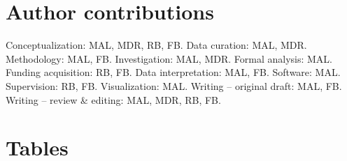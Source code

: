 \documentclass{article}
\begin{document}
\section*{Author contributions}
Conceptualization: MAL, MDR, RB, FB.
Data curation: MAL, MDR.
Methodology: MAL, FB.
Investigation: MAL, MDR.
Formal analysis: MAL.
Funding acquisition: RB, FB.
Data interpretation: MAL, FB.
Software: MAL.
Supervision: RB, FB.
Visualization: MAL.
Writing -- original draft: MAL, FB.
Writing -- review \& editing: MAL, MDR, RB, FB.

\clearpage




\clearpage

\section*{Tables}
\end{document}
